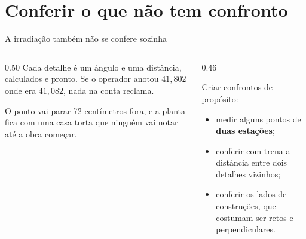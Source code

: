 \documentclass[aspectratio=169,11pt]{beamer}
\newcommand{\bnum}[1]{\textbf{\textcolor{mTeal}{#1}}}
\begin{document}
\section{Conferir o que não tem confronto}

\begin{frame}{A irradiação também não se confere sozinha}
  \begin{columns}[c]
    \begin{column}{0.50\textwidth}
      Cada detalhe é um ângulo e uma distância, calculados e pronto. Se o operador anotou
      $41{,}802$ onde era $41{,}082$, \alert{nada na conta reclama}.
      \medskip

      O ponto vai parar 72 centímetros fora, e a planta fica com uma casa torta que ninguém
      vai notar até a obra começar.
    \end{column}
    \begin{column}{0.46\textwidth}
      \begin{ideia}[title={A saída}]
        Criar confrontos de propósito:
        \medskip
        \begin{itemize}
          \item medir alguns pontos de \bnum{duas estações};
          \item conferir com trena a distância entre dois detalhes vizinhos;
          \item conferir os lados de construções, que costumam ser retos e perpendiculares.
        \end{itemize}
      \end{ideia}
    \end{column}
  \end{columns}
\end{frame}
\end{document}
